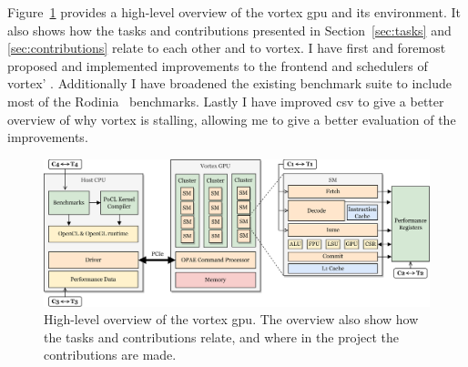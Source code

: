 Figure~\ref{fig:task-contribution} provides a high-level overview of the \Gls{vortex} \acrshort{gpu} and its environment. It also shows how the tasks and contributions presented in Section~\ref{sec:tasks} and \ref{sec:contributions} relate to each other and to \Gls{vortex}. I have first and foremost proposed and implemented improvements to the frontend and schedulers of \Gls{vortex}' . Additionally I have broadened the existing benchmark suite to include most of the Rodinia~\cite{rodinia, rodinia_characterization} benchmarks. Lastly I have improved \acrshort{csv} to give a better overview of why \Gls{vortex} is stalling, allowing me to give a better evaluation of the improvements.

\begin{figure}
    \centering
    \includegraphics[width=\textwidth]{figures/task-contribution-4.png}
    \caption[High-level overview of the \Gls{vortex} \acrshort{gpu}]{High-level overview of the \Gls{vortex} \acrshort{gpu}. The overview also show how the tasks and contributions relate, and where in the project the contributions are made.}
    \label{fig:task-contribution}
\end{figure}





